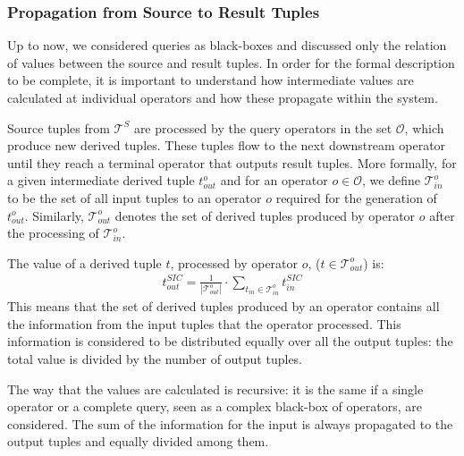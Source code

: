 \subsubsection*{\sic Propagation from Source to Result Tuples}
\vspace{-5pt}
Up to now, we considered queries as black-boxes and discussed only the relation of \sic values between
the source and result tuples. In order for the formal description to be complete, it is important to
understand how intermediate \sic values are calculated at individual operators and how these propagate
within the system.

Source tuples from $\mathcal{T}^{S}$ are processed by the query operators in the set $\mathcal{O}$, which
produce new derived tuples. These tuples flow to the next downstream operator until they reach a terminal
operator that outputs result tuples.
More formally, for a given intermediate derived tuple $t_{out}^{o}$ and for an operator $o \in
\mathcal{O}$, we define $\mathcal{T}_{in}^{o}$ to be the set of all input tuples to an operator $o$ required for the
generation of $t_{out}^o$.
Similarly, $\mathcal{T}_{out}^{o}$ denotes the set of derived tuples produced by operator $o$ after the
processing of $\mathcal{T}_{in}^{o}$.

The \sic value of a derived tuple $t$, processed by operator $o$, (\ie $t \in \mathcal{T}_{out}^{o}$) is:
\begin{align} 
	t^{SIC}_{out} = \frac{1}{|\mathcal{T}_{out}^{o}|} \cdot \displaystyle\sum_{t_{in} \in
	\mathcal{T}_{in}^{o}}{t^{SIC}_{in}}
\end{align}
This means that the set of derived tuples produced by an operator contains all the information from the
input tuples that the operator processed. This information is considered to be distributed equally over
all the output tuples: the total value is divided by the number of output tuples.

The way that the \sic values are calculated is recursive: it is the same if a
single operator or a complete query, seen as a complex black-box of operators, are considered. The sum of
the information for the input is always propagated to the output tuples and equally divided among them. 
\vspace{-10pt}
